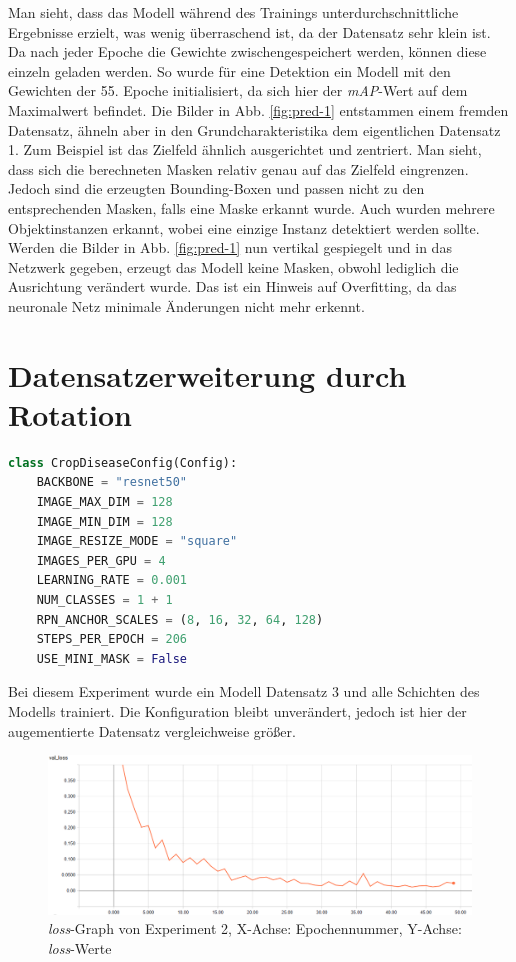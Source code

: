 \noindent
Man sieht, dass das Modell während des Trainings unterdurchschnittliche Ergebnisse erzielt, was wenig überraschend ist, da der Datensatz sehr klein ist. Da nach jeder Epoche die Gewichte zwischengespeichert werden, können diese einzeln geladen werden. So wurde für eine Detektion ein Modell mit den Gewichten der 55. Epoche initialisiert, da sich hier der \textit{mAP}-Wert auf dem Maximalwert befindet. Die Bilder in Abb. \ref{fig:pred-1} entstammen einem fremden Datensatz, ähneln aber in den Grundcharakteristika dem eigentlichen Datensatz 1. Zum Beispiel ist das Zielfeld ähnlich ausgerichtet und zentriert. Man sieht, dass sich die berechneten Masken relativ genau auf das Zielfeld eingrenzen. Jedoch sind die erzeugten Bounding-Boxen und passen nicht zu den entsprechenden Masken, falls eine Maske erkannt wurde. Auch wurden mehrere Objektinstanzen erkannt, wobei eine einzige Instanz detektiert werden sollte. Werden die Bilder in Abb. \ref{fig:pred-1} nun vertikal gespiegelt und in das Netzwerk gegeben, erzeugt das Modell keine Masken, obwohl lediglich die Ausrichtung verändert wurde. Das ist ein Hinweis auf Overfitting, da das neuronale Netz minimale Änderungen nicht mehr erkennt.

\section{Datensatzerweiterung durch Rotation}\label{sub:sub:sec:experiment-2}

\begin{lstlisting}[language=python,caption={Konfiguration für Experiment 2},captionpos=b]
class CropDiseaseConfig(Config):
    BACKBONE = "resnet50"
    IMAGE_MAX_DIM = 128
    IMAGE_MIN_DIM = 128
    IMAGE_RESIZE_MODE = "square"
    IMAGES_PER_GPU = 4
    LEARNING_RATE = 0.001
    NUM_CLASSES = 1 + 1
    RPN_ANCHOR_SCALES = (8, 16, 32, 64, 128)
    STEPS_PER_EPOCH = 206
    USE_MINI_MASK = False
\end{lstlisting}
\noindent
Bei diesem Experiment wurde ein Modell Datensatz 3 und alle Schichten des Modells trainiert. Die Konfiguration bleibt unverändert, jedoch ist hier der augementierte Datensatz vergleichweise größer.

\begin{figure}[ht]
	\centering
    \includegraphics[width=.7\textwidth]{pics/val-loss-2.PNG}
    \caption{\textit{loss}-Graph von Experiment 2, X-Achse: Epochennummer, Y-Achse: \textit{loss}-Werte}
    \label{fig:val-loss-2}
\end{figure}

